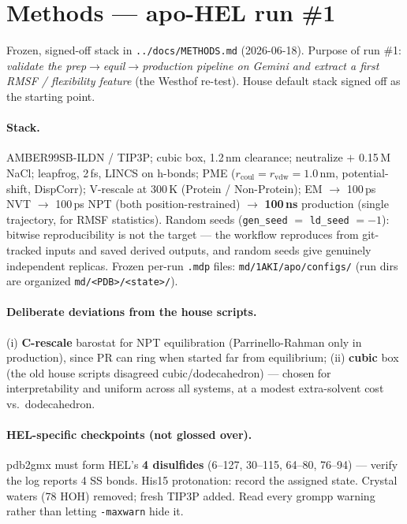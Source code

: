 \section{Methods --- apo-HEL run \#1}

Frozen, signed-off stack in \texttt{../docs/METHODS.md} (2026-06-18). Purpose of run \#1:
\emph{validate the prep$\to$equil$\to$production pipeline on Gemini and extract a first RMSF /
flexibility feature} (the Westhof re-test). House default stack signed off as the starting point.

\paragraph{Stack.} AMBER99SB-ILDN / TIP3P; cubic box, 1.2\,nm clearance; neutralize $+$
0.15\,M NaCl; leapfrog, 2\,fs, LINCS on h-bonds; PME ($r_\mathrm{coul}=r_\mathrm{vdw}=1.0$\,nm,
potential-shift, DispCorr); V-rescale at 300\,K (Protein / Non-Protein); EM $\to$ 100\,ps NVT $\to$
100\,ps NPT (both position-restrained) $\to$ \textbf{100\,ns} production (single trajectory, for
RMSF statistics). Random seeds (\texttt{gen\_seed} $=$ \texttt{ld\_seed} $= -1$): bitwise
reproducibility is not the target --- the workflow reproduces from git-tracked inputs and saved
derived outputs, and random seeds give genuinely independent replicas. Frozen per-run \texttt{.mdp}
files: \texttt{md/1AKI/apo/configs/} (run dirs are organized \texttt{md/<PDB>/<state>/}).

\paragraph{Deliberate deviations from the house scripts.}
(i) \textbf{C-rescale} barostat for NPT equilibration (Parrinello-Rahman only in production), since
PR can ring when started far from equilibrium; (ii) \textbf{cubic} box (the old house scripts
disagreed cubic/dodecahedron) --- chosen for interpretability and uniform across all systems, at a
modest extra-solvent cost vs.\ dodecahedron.

\paragraph{HEL-specific checkpoints (not glossed over).} pdb2gmx must form HEL's \textbf{4 disulfides}
(6--127, 30--115, 64--80, 76--94) --- verify the log reports 4 SS bonds. His15 protonation: record the
assigned state. Crystal waters (78 HOH) removed; fresh TIP3P added. Read every grompp warning rather
than letting \texttt{-maxwarn} hide it.

